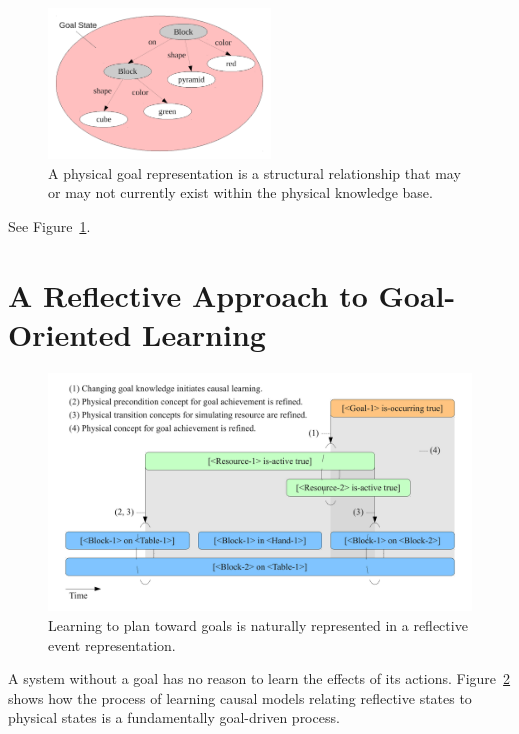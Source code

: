 \begin{figure}[bth]
  \center
  \includegraphics[height=4cm]{gfx/goal_state}
  \caption[A physical goal representation]{A physical goal
    representation is a structural relationship that may or may not
    currently exist within the physical knowledge base.}
  \label{fig:goal_state}
\end{figure}

See Figure~\ref{fig:goal_state}.


\section{A Reflective Approach to Goal-Oriented Learning}

\begin{figure}[bth]
  \center
  \includegraphics[width=12cm]{gfx/learning_to_plan}
  \caption[Learning to plan toward goals]{Learning to plan toward
    goals is naturally represented in a reflective event
    representation.}
  \label{fig:learning_to_plan}
\end{figure}

A system without a goal has no reason to learn the effects of its
actions.  Figure~\ref{fig:learning_to_plan} shows how the process of
learning causal models relating reflective states to physical states
is a fundamentally goal-driven process.



